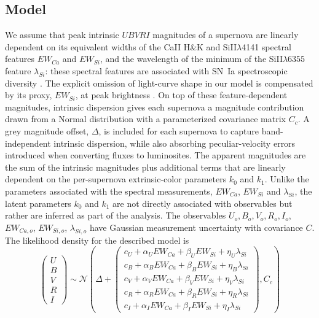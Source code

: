 \documentclass{aastex61}   	%
\begin{document}
\subsection{Model}
We assume 
that  peak intrinsic $UBVRI$ magnitudes of a supernova are linearly dependent
on its
 equivalent widths of the CaII H\&K and SiII$\lambda$4141 spectral features
$EW_{Ca}$ and $EW_{Si}$,
and the wavelength of the minimum of 
the SiII$\lambda6355$ feature $\lambda_{Si}$:
these spectral features are associated with SN~Ia  spectroscopic diversity  
\citep{2006PASP..118..560B, 2008A&A...492..535A, 2009A&A...500L..17B, 2009PASP..121..238B, 2009ApJ...699L.139W, 2011ApJ...729...55F}.
The explicit omission of light-curve shape in our model is compensated by its proxy,
$EW_{Si}$, at peak brightness
\citep{2008A&A...492..535A, 2011A&A...529L...4C}. On top of these feature-dependent magnitudes, intrinsic dispersion
gives each supernova a magnitude contribution drawn from a Normal distribution with a parameterized covariance matrix
$C_c$.  A grey magnitude offset, $\Delta$, is included for each supernova
to capture band-independent intrinsic dispersion, while also absorbing peculiar-velocity errors introduced when converting
fluxes to luminosites.
The apparent magnitudes are the sum of the intrinsic magnitudes plus additional terms that are linearly dependent on the
per-supernova
extrinsic-color parameters $k_0$ and $k_1$.  
Unlike the parameters associated with
the spectral measurements, $EW_{Ca}$, $EW_{Si}$ and $\lambda_{Si}$,  the latent
parameters $k_0$ and $k_1$ are not directly associated
with observables but rather are inferred as part of the analysis.
The observables
$U_o, B_o, V_o, R_o, I_o$, $EW_{Ca,o}$, $EW_{Si,o}$, $\lambda_{Si,o}$
have Gaussian measurement uncertainty with covariance $C$.
The
likelihood density for the described model
is
\begin{equation}
\begin{pmatrix}
U\\B\\V\\R\\I
\end{pmatrix}
\sim \mathcal{N}
\left(
\Delta +
\begin{pmatrix}
c_U+\alpha_U EW_{Ca} + \beta_U EW_{Si} + \eta_U \lambda_{Si} \\
c_B+\alpha_B EW_{Ca} + \beta_B EW_{Si} + \eta_B \lambda_{Si}  \\
c_V+\alpha_V EW_{Ca} + \beta_V EW_{Si} + \eta_V \lambda_{Si} \\
c_R+\alpha_R EW_{Ca} + \beta_R EW_{Si} + \eta_R \lambda_{Si} \\
c_I+\alpha_I EW_{Ca} + \beta_I EW_{Si}+ \eta_I \lambda_{Si}
\end{pmatrix}
,C_{c}
\right)
\label{ewsiv:eqn}
\end{equation}
\end{document}
